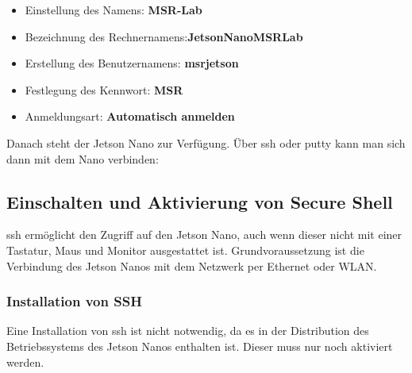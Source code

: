 \begin{itemize}
    \item Einstellung des Namens: \textbf{MSR-Lab}
    \item Bezeichnung des Rechnernamens:\textbf{JetsonNanoMSRLab}
    \item Erstellung des Benutzernamens: \textbf{msrjetson}
    \item Festlegung des Kennwort: \textbf{MSR}
    \item Anmeldungsart: \textbf{Automatisch anmelden}
\end{itemize}


\bigskip

Danach steht der Jetson Nano zur Verfügung. Über ssh oder putty kann man sich dann mit dem Nano verbinden:

\medskip


\medskip


\subsection{Einschalten und Aktivierung von Secure Shell}

\ac{ssh} ermöglicht den Zugriff auf den Jetson Nano, auch wenn dieser nicht mit einer Tastatur, Maus und Monitor
ausgestattet ist. Grundvoraussetzung ist die Verbindung des Jetson Nanos mit dem Netzwerk per Ethernet oder WLAN. 

\subsubsection{Installation von SSH}

Eine Installation von \ac{ssh} ist nicht notwendig, da es in der Distribution des Betriebssystems des Jetson Nanos enthalten ist. Dieser muss nur noch aktiviert werden.

%
%
%
%
%


